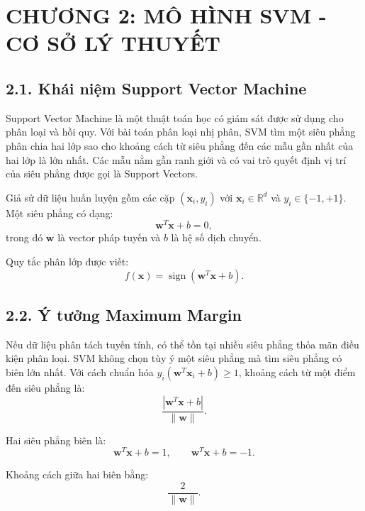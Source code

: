 \documentclass{article}
\begin{document}
	\newpage
	\section{\centering CHƯƠNG 2: MÔ HÌNH SVM - CƠ SỞ LÝ THUYẾT}
	\subsection{2.1. Khái niệm Support Vector Machine}
	\hspace{0.5cm}
	Support Vector Machine là một thuật toán học có giám sát được sử dụng cho phân loại và hồi quy. Với bài toán phân loại nhị phân, SVM tìm một siêu phẳng phân chia hai lớp sao cho khoảng cách từ siêu phẳng đến các mẫu gần nhất của hai lớp là lớn nhất. Các mẫu nằm gần ranh giới và có vai trò quyết định vị trí của siêu phẳng được gọi là Support Vectors.
	
	Giả sử dữ liệu huấn luyện gồm các cặp $(\mathbf{x}_i,y_i)$ với $\mathbf{x}_i\in\mathbb{R}^d$ và $y_i\in\{-1,+1\}$. Một siêu phẳng có dạng:
	\begin{equation}
		\mathbf{w}^{T}\mathbf{x}+b=0,
	\end{equation}
	trong đó $\mathbf{w}$ là vector pháp tuyến và $b$ là hệ số dịch chuyển.
	
	Quy tắc phân lớp được viết:
	\begin{equation}
		f(\mathbf{x})=\operatorname{sign}(\mathbf{w}^{T}\mathbf{x}+b).
	\end{equation}
	
	\subsection{2.2. Ý tưởng Maximum Margin}
	\hspace{0.5cm}
	Nếu dữ liệu phân tách tuyến tính, có thể tồn tại nhiều siêu phẳng thỏa mãn điều kiện phân loại. SVM không chọn tùy ý một siêu phẳng mà tìm siêu phẳng có biên lớn nhất. Với cách chuẩn hóa $y_i(\mathbf{w}^{T}\mathbf{x}_i+b)\geq1$, khoảng cách từ một điểm đến siêu phẳng là:
	\begin{equation}
		\frac{|\mathbf{w}^{T}\mathbf{x}+b|}{\|\mathbf{w}\|}.
	\end{equation}
	
	Hai siêu phẳng biên là:
	\begin{equation}
		\mathbf{w}^{T}\mathbf{x}+b=1,
		\qquad
		\mathbf{w}^{T}\mathbf{x}+b=-1.
	\end{equation}
	
	Khoảng cách giữa hai biên bằng:
	\begin{equation}
		\frac{2}{\|\mathbf{w}\|}.
	\end{equation}
	
\end{document}
